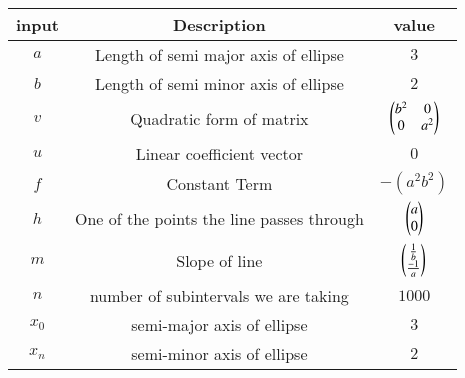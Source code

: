 \begin{tabular}[10pt]{ |c| c| c|}
    \hline
    \textbf{input}&\textbf{Description}&\textbf{value}\\
    \hline 
    $a$&Length of semi major axis of ellipse&$3$\\
    \hline
    $b$&Length of semi minor axis of ellipse&$2$\\
    \hline
    $v$&Quadratic form of matrix&$\begin{pmatrix}b^2&0\\0&a^2\end{pmatrix}$\\
    \hline 
    $u$&Linear coefficient vector&$0$\\
    \hline 
    $f$&Constant Term&$-(a^2b^2)$\\
    \hline
    $h$&One of the points the line passes through&$\begin{pmatrix}a\\0\end{pmatrix}$\\
    \hline
    $m$&Slope of line&$\begin{pmatrix}\frac{1}{b}\\\frac{-1}{a}\end{pmatrix}$\\
    \hline
    $n$& number of subintervals we are taking & $1000$\\
    \hline
    $x_0$& semi-major axis of ellipse& $3$\\
    \hline
    $x_n$& semi-minor axis of ellipse& $2$\\
    \hline
    \end{tabular}
